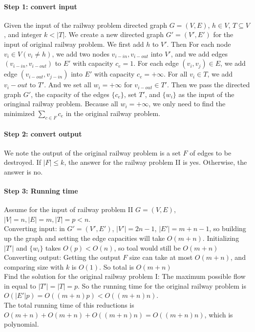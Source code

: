 \documentclass{article}
\begin{document}
	\paragraph{Step 1: convert input}
	Given the input of the railway problem directed graph $G=(V,E)$, $h\in V$, $T\subseteq V$, and integer $k<|T|$. We create a new directed graph $G'=(V',E')$ for the input of original railway problem. We first add $h$ to $V'$. Then For each node $v_i\in V (v_i\neq h)$, we add two nodes $v_{i-in}, v_{i-out}$ into $V'$, and we add edges $(v_{i-in}, v_{i-out})$ to $E'$ with capacity $c_e=1$. For each edge $(v_i, v_j)\in E$, we add edge $(v_{i-out},v_{j-in})$ into $E'$ with capacity $c_e=+\infty$. For all $v_i\in T$, we add $v_i-out$ to $T'$. And we set all $w_i=+\infty$ for $v_{i-out}\in T'$. Then we pass the directed graph $G'$, the capacity of the edges $\{c_e\}$, set $T'$, and $\{w_i\}$ as the input of the oringinal railway problem. Because all $w_i=+\infty$, we only need to find the minimized $\sum_{c\in F}{c_e}$ in the original railway problem.
	\paragraph{Step 2: convert output}
	We note the output of the original railway problem is a set $F$ of edges to be destroyed. If $|F|\leq k$, the answer for the railway problem II is yes. Otherwise, the answer is no.
	\paragraph{Step 3: Running time}
	Assume for the input of railway problem II $G=(V,E)$, $|V|=n,|E|=m, |T|=p<n$. \\
	Converting input: in $G'=(V',E')$, $|V'|=2n-1$, $|E'|=m+n-1$, so building up the graph and setting the edge capacities will take $O(m+n)$. Initializing $|T'|$ and $\{w_i\}$ takes $O(p)<O(n)$, so toal would still be $O(m+n)$\\
	Converting output: Getting the output $F$ size can take at most $O(m+n)$, and comparing size with $k$ is $O(1)$. So total is $O(m+n)$\\
	Find the solution for the original railway problem I: The maximum possible flow in equal to $|T'|=|T|=p$. So the running time for the original railway problem is $O(|E'|p)=O((m+n)p)<O((m+n)n)$.\\
	The total running time of this reductions is $O(m+n)+O(m+n)+O((m+n)n)=O((m+n)n)$, which is polynomial.
\end{document}
